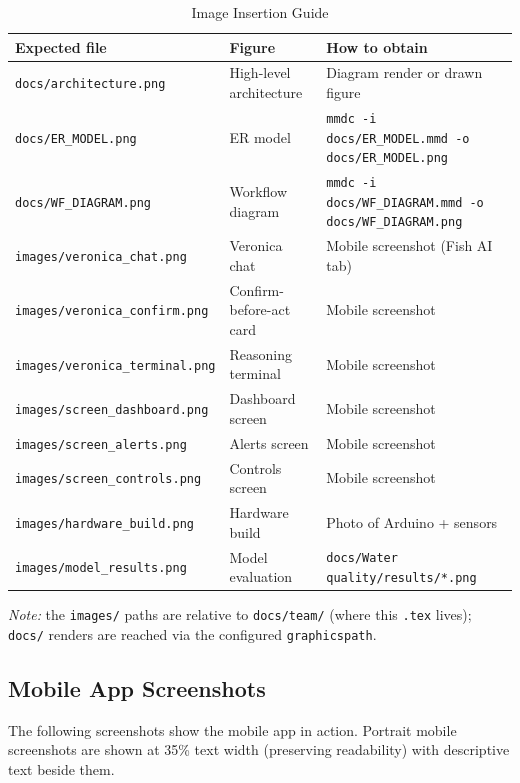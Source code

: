 \documentclass[12pt,a4paper,oneside]{article}
\begin{document}
\begin{table}[H]
    \centering\small
    \begin{tabularx}{\textwidth}{llX}
        \toprule
        \textbf{Expected file} & \textbf{Figure} & \textbf{How to obtain} \\
        \midrule
        \texttt{docs/architecture.png} & High-level architecture & Diagram render or drawn figure \\
        \texttt{docs/ER\_MODEL.png} & ER model & \texttt{mmdc -i docs/ER\_MODEL.mmd -o docs/ER\_MODEL.png} \\
        \texttt{docs/WF\_DIAGRAM.png} & Workflow diagram & \texttt{mmdc -i docs/WF\_DIAGRAM.mmd -o docs/WF\_DIAGRAM.png} \\
        \texttt{images/veronica\_chat.png} & Veronica chat & Mobile screenshot (Fish AI tab) \\
        \texttt{images/veronica\_confirm.png} & Confirm-before-act card & Mobile screenshot \\
        \texttt{images/veronica\_terminal.png} & Reasoning terminal & Mobile screenshot \\
        \texttt{images/screen\_dashboard.png} & Dashboard screen & Mobile screenshot \\
        \texttt{images/screen\_alerts.png} & Alerts screen & Mobile screenshot \\
        \texttt{images/screen\_controls.png} & Controls screen & Mobile screenshot \\
        \texttt{images/hardware\_build.png} & Hardware build & Photo of Arduino + sensors \\
        \texttt{images/model\_results.png} & Model evaluation & \texttt{docs/Water quality/results/*.png} \\
        \bottomrule
    \end{tabularx}
    \caption{Image Insertion Guide}
\end{table}

\textit{Note:} the \texttt{images/} paths are relative to \texttt{docs/team/} (where this
\texttt{.tex} lives); \texttt{docs/} renders are reached via the configured \texttt{graphicspath}.

\subsection{Mobile App Screenshots}
The following screenshots show the mobile app in action. Portrait mobile screenshots are
shown at 35\% text width (preserving readability) with descriptive text beside them.
\end{document}
